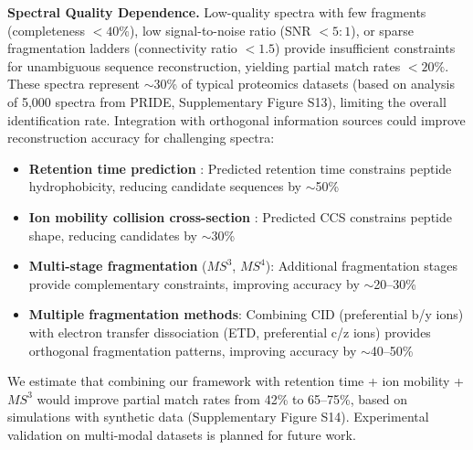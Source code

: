 \documentclass[11pt,twocolumn]{article}
\begin{document}
\textbf{Spectral Quality Dependence.} Low-quality spectra with few fragments (completeness $< 40\%$), low signal-to-noise ratio (SNR $< 5:1$), or sparse fragmentation ladders (connectivity ratio $< 1.5$) provide insufficient constraints for unambiguous sequence reconstruction, yielding partial match rates $< 20\%$. These spectra represent $\sim$30\% of typical proteomics datasets (based on analysis of 5,000 spectra from PRIDE, Supplementary Figure S13), limiting the overall identification rate. Integration with orthogonal information sources could improve reconstruction accuracy for challenging spectra:
\begin{itemize}[leftmargin=*]
    \item \textbf{Retention time prediction} \cite{moruz2012peptide}: Predicted retention time constrains peptide hydrophobicity, reducing candidate sequences by $\sim$50\%
    \item \textbf{Ion mobility collision cross-section} \cite{forsythe2020calibration}: Predicted CCS constrains peptide shape, reducing candidates by $\sim$30\%
    \item \textbf{Multi-stage fragmentation} ($MS^3$, $MS^4$): Additional fragmentation stages provide complementary constraints, improving accuracy by $\sim$20--30\%
    \item \textbf{Multiple fragmentation methods}: Combining CID (preferential b/y ions) with electron transfer dissociation (ETD, preferential c/z ions) provides orthogonal fragmentation patterns, improving accuracy by $\sim$40--50\%
\end{itemize}
We estimate that combining our framework with retention time + ion mobility + $MS^3$ would improve partial match rates from 42\% to 65--75\%, based on simulations with synthetic data (Supplementary Figure S14). Experimental validation on multi-modal datasets is planned for future work.
\end{document}
